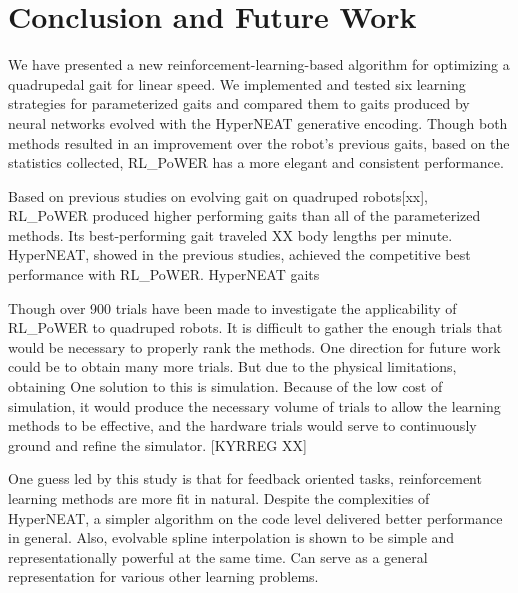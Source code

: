 \section{Conclusion and Future Work}

We have presented a new reinforcement-learning-based algorithm for
optimizing a quadrupedal gait for linear speed. We implemented and
tested six learning strategies for parameterized gaits and compared
them to gaits produced by neural networks evolved with the HyperNEAT
generative encoding. Though both methods resulted in an improvement
over the robot’s previous \naive gaits, based on the statistics
collected, RL\_PoWER has a more elegant and consistent performance.

Based on previous studies on evolving gait on quadruped robots[xx],
RL\_PoWER produced higher performing gaits than all of the
parameterized methods. Its best-performing gait traveled XX body
lengths per minute.  HyperNEAT, showed in the previous studies,
achieved the competitive best performance with RL\_PoWER. HyperNEAT
gaits

Though over 900 trials have been made to investigate the applicability
of RL\_PoWER to quadruped robots. It is difficult to gather the enough
trials that would be necessary to properly rank the methods. One
direction for future work could be to obtain many more trials. But due
to the physical limitations, obtaining One solution to this is
simulation. Because of the low cost of simulation, it would produce
the necessary volume of trials to allow the learning methods to be
effective, and the hardware trials would serve to continuously ground
and refine the simulator. [KYRREG XX]

One guess led by this study is that for feedback oriented tasks,
reinforcement learning methods are more fit in natural. Despite the
complexities of HyperNEAT, a simpler algorithm on the code level
delivered better performance in general.  Also, evolvable spline
interpolation is shown to be simple and representationally powerful at
the same time. Can serve as a general representation for various other
learning problems.
